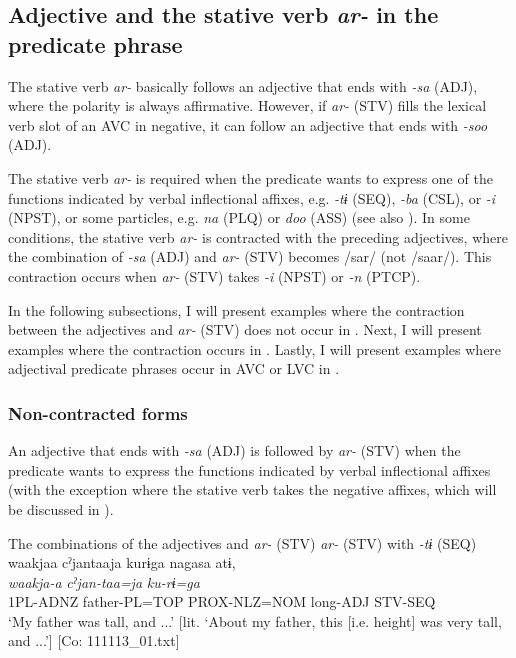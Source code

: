 \subsection{Adjective and the stative verb \textit{ar-} in the predicate phrase}\label{sec:9.2.2}

The stative verb \textit{ar-} basically follows an adjective that ends with \textit{{}-sa} (ADJ), where the polarity is always affirmative. However, if \textit{ar-} (STV) fills the lexical verb slot of an AVC in negative, it can follow an adjective that ends with \textit{{}-soo} (ADJ).

The stative verb \textit{ar-} is required when the predicate wants to express one of the functions indicated by verbal inflectional affixes, e.g. \textit{{}-tɨ} (SEQ), \textit{{}-ba} (CSL), or \textit{-i} (NPST), or some particles, e.g. \textit{na} (PLQ) or \textit{doo} (ASS) (see also ). In some conditions, the stative verb \textit{ar-} is contracted with the preceding adjectives, where the combination of \textit{{}-sa} (ADJ) and \textit{ar-} (STV) becomes /sar/ (not /saar/). This contraction occurs when \textit{ar-} (STV) takes \textit{{}-i} (NPST) or \textit{{}-n} (PTCP).

  In the following subsections, I will present examples where the contraction between the adjectives and \textit{ar-} (STV) does not occur in . Next, I will present examples where the contraction occurs in . Lastly, I will present examples where adjectival predicate phrases occur in AVC or LVC in .

\subsubsection{Non-contracted forms}\label{sec:9.2.2.1}
\label{bkm:Ref361739107}
An adjective that ends with \textit{{}-sa} (ADJ) is followed by \textit{ar-} (STV) when the predicate wants to express the functions indicated by verbal inflectional affixes (with the exception where the stative verb takes the negative affixes, which will be discussed in ).

\ea   The combinations of the adjectives and \textit{ar-} (STV) \label{ex:9.45}
\exi{}  \textit{ar-} (STV) with \textit{{}-tɨ} (SEQ)
\ea %
 \glll  waakjaa  cˀjantaaja  kurɨga  nagasa  atɨ,\\
      \textit{waakja-a}  \textit{cˀjan-taa=ja}  \textit{ku-rɨ=ga}  \textit{}  \textit{}\\
      1PL-ADNZ  father-PL=TOP  PROX-NLZ=NOM  long-ADJ  STV-SEQ\\
      \glt       ‘My father was tall, and ...’ [lit. ‘About my father, this [i.e. height] was very tall, and ...’] [Co: 111113\_01.txt]

